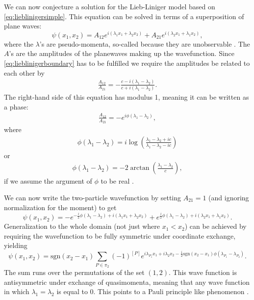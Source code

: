 \documentclass[11pt, a4paper,draft]{report} %
\begin{document}
We can now conjecture a solution for the Lieb-Liniger model based on \cref{eq:lieblinigersimple}.
This equation can be solved in terms of a superposition of plane waves:
\begin{equation}
	\psi(x_1,x_2) = A_{12} e^{i(\lambda_1x_1 + \lambda_2 x_2)} + A_{21} e^{i(\lambda_2 x_1 + \lambda_1 x_2)},
\end{equation}
where the \(\lambda\)'s are pseudo-momenta, so-called because they are unobservable \cite{Franchini2017}.
The \(A\)'s are the amplitudes of the planewaves making up the wavefunction.
Since \cref{eq:lieblinigerboundary} has to be fulfilled we require the amplitudes be related to each other by
\begin{align}
	\frac{A_{12}}{A_{21}} = -\frac{c-i(\lambda_1 - \lambda_2) }{c+i(\lambda_1 - \lambda_2)}.
\end{align}
The right-hand side of this equation has modulus 1, meaning it can be written as a phase:
\begin{align}
	\frac{A_{12}}{A_{21}} = -e^{i\phi(\lambda_1-\lambda_2)},
\end{align}
where \cite{Korepin1993}
\begin{align}
  \phi(\lambda_1-\lambda_2) = i \log(\frac{\lambda_1-\lambda_2 + ic}{\lambda_1-\lambda_2-ic})
\end{align}
or
\begin{align}
	\phi(\lambda_1-\lambda_2) = -2\arctan\left(\frac{\lambda_1-\lambda_2}{c}\right),
\end{align}
if we assume the argument of \(\phi\) to be real \cite{Lieb1963}.

We can now write the two-particle wavefunction by setting \(A_{21}=1\) (and ignoring normalization for the moment) to get
\begin{equation}
	\psi(x_1,x_2) = - e^{-\frac{i}{2}\phi(\lambda_1-\lambda_2)+i(\lambda_1x_1 + \lambda_2 x_2)} + e^{\frac{i}{2}\phi(\lambda_1-\lambda_2)+i(\lambda_2 x_1 + \lambda_1 x_2)}.
\end{equation}
Generalization to the whole domain (not just where \(x_1 < x_2\)) can be achieved by requiring the wavefunction to be fully symmetric under coordinate exchange,
yielding
\begin{equation}
  \psi(x_1,x_2) = \textrm{sgn}(x_2-x_1)\sum_{P\in\pi_2} (-1)^{[P]} e^{i\lambda_{P_1}x_1 + i \lambda_2 x_2- \frac{i}{2} \textrm{sgn}(x_2-x_1)\phi(\lambda_{P_1}-\lambda_{P_2})}.
\end{equation}
The sum runs over the permutations of the set \((1,2)\).
This wave function is antisymmetric under exchange of quasimomenta, meaning that any wave function in which \(\lambda_1=\lambda_2\) is equal to 0.
This points to a Pauli principle like phenomenon \cite{tofind}.
\end{document}
